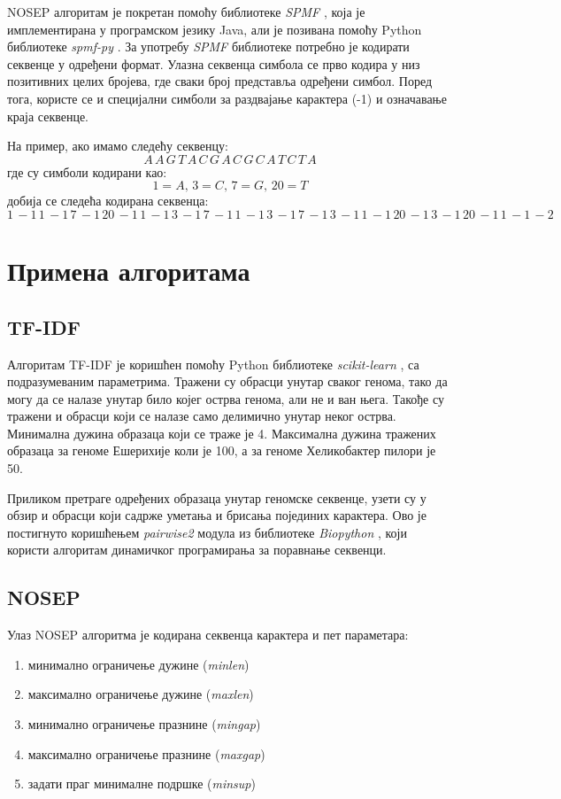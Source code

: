 \documentclass[12pt]{article}
\begin{document}
NOSEP алгоритам је покретан помоћу библиотеке \textit{SPMF} \cite{fournierviger2016spmf}, која је имплементирана у програмском језику Java, али је позивана помоћу Python библиотеке \textit{spmf-py} \cite{spmf-py}. За употребу \textit{SPMF} библиотеке потребно је кодирати секвенце у одређени формат. Улазна секвенца симбола се прво кодира у низ позитивних целих бројева, где сваки број представља одређени симбол. Поред тога, користе се и специјални симболи за раздвајање карактера (-1) и означавање краја секвенце.

На пример, ако имамо следећу секвенцу:
$$ A\,  A\, G\, T\, A\, C\, G\, A\, C\, G\, C\, A\, T\, C\, T\, A  $$
где су симболи кодирани као:
$$ 1 = A,\, 3 = C,\, 7 = G,\, 20 = T $$
добија се следећа кодирана секвенца:
$$ 1\, -1\, 1\, -1\, 7\, -1\, 20\, -1\, 1\, -1\, 3\, -1\, 7\, -1\, 1\, -1\, 3\, -1\, 7\, -1\, 3\, -1\, 1\, -1\, 20\, -1\, 3\, -1\, 20\, -1\, 1\, -1\, -2\, $$


\section{Примена алгоритама}

\subsection{TF-IDF}
Алгоритам TF-IDF је коришћен помоћу Python библиотеке \textit{scikit-learn} \cite{scikit-learn}, са подразумеваним параметрима. Тражени су обрасци унутар сваког генома, тако да могу да се налазе унутар било којег острва генома, али не и ван њега. Такође су тражени и обрасци који се налазе само делимично унутар неког острва. Минимална дужина образаца који се траже је 4. Максимална дужина тражених образаца за геноме Ешерихије коли је 100, а за геноме Хеликобактер пилори је 50.

Приликом претраге одређених образаца унутар геномске секвенце, узети су у обзир и обрасци који садрже уметања и брисања појединих карактера. Ово је постигнуто коришћењем \textit{pairwise2} модула из библиотеке \textit{Biopython} \cite{cock2009biopython}, који користи алгоритам динамичког програмирања за поравнање секвенци.

\subsection{NOSEP}

Улаз NOSEP алгоритма је кодирана секвенца карактера и пет параметара:
\begin{enumerate}
 \item минимално ограничење дужине (\textit{minlen})
 \item максимално ограничење дужине (\textit{maxlen})
 \item минимално ограничење празнине (\textit{mingap})
 \item максимално ограничење празнине (\textit{maxgap})
 \item задати праг минималне подршке (\textit{minsup})\\
\end{enumerate}
\end{document}
